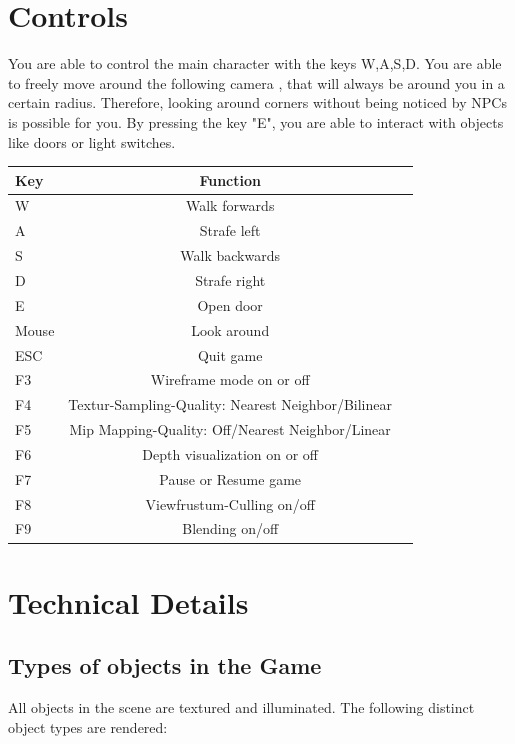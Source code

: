 \documentclass[12pt]{article}
\begin{document}
\section*{Controls} 

You are able to control the main character with the keys W,A,S,D. You are able to freely move around the following camera , that will always be around you in a certain radius. Therefore, looking around corners without being noticed by NPCs is possible for you. By pressing the key "E", you are able to interact with objects like doors or light switches. 

\begin{table}[h!]
  \centering
  \label{table1}
  \begin{tabular}{p{3cm} | c c}
Key & Function\\
    \hline
W & Walk forwards	\\
A & Strafe left \\
S & Walk backwards \\
D & Strafe right \\
E & Open door\\

Mouse & Look around\\

 ESC & Quit game \\
 F3 & Wireframe mode on or off \\
 F4 & Textur-Sampling-Quality: Nearest Neighbor/Bilinear\\
 F5 & Mip Mapping-Quality: Off/Nearest Neighbor/Linear\\
 F6 & Depth visualization on or off\\ 
 F7 & Pause or Resume game \\
 F8 & Viewfrustum-Culling on/off\\
 F9 & Blending on/off\\
  \end{tabular}
\end{table}


\section*{Technical Details} 
\subsection*{Types of objects in the Game}

All objects in the scene are textured and illuminated. The following distinct object types are rendered:
\end{document}
